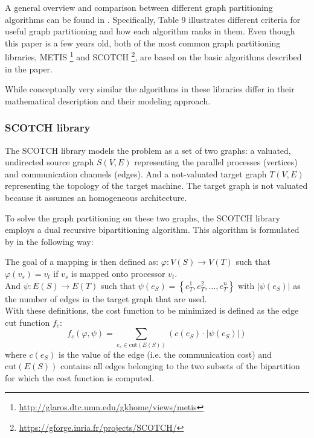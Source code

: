 A general overview and comparison between different graph partitioning algorithms can be found in \citet{karypis1998fast}.
Specifically, Table 9 illustrates different criteria for useful graph partitioning and how each algorithm ranks in them.
Even though this paper is a few years old, both of the most common graph partitioning libraries, METIS \footnote{\href{http://glaros.dtc.umn.edu/gkhome/views/metis}{http://glaros.dtc.umn.edu/gkhome/views/metis}} and SCOTCH \footnote{\href{https://gforge.inria.fr/projects/SCOTCH/}{https://gforge.inria.fr/projects/SCOTCH/}}, are based on the basic algorithms described in the paper.

While conceptually very similar the algorithms in these libraries differ in their mathematical description and their modeling approach.

\subsubsection{SCOTCH library}
The SCOTCH library models the problem as a set of two graphs:
a valuated, undirected source graph $S(V, E)$ representing the parallel processes (vertices) and communication channels (edges). And a not-valuated target graph $T(V, E)$ representing the topology of the target machine.
The target graph is not valuated because it assumes an homogeneous architecture.

To solve the graph partitioning on these two graphs, the SCOTCH library employs a dual recursive bipartitioning algorithm.
This algorithm is formulated by \citet{pellegrini1994static} in the following way:

The goal of a mapping is then defined as:
$\varphi : V\left(S\right) \rightarrow V\left(T\right)$ such that $\varphi\left(v_s\right) = v_t $ if $v_s$ is mapped onto processor $v_t$.
\\
And $\psi : E\left(S\right) \rightarrow E\left(T\right)$ such that $\psi\left(e_S\right) = \left\{ e_T^1, e_T^2, \dots, e_T^n \right\}$ with $\left| \psi\left(e_S\right) \right|$ as the number of edges in the target graph that are used.
\\
With these definitions, the cost function to be minimized is defined as the edge cut function $f_c$:
\begin{equation}
f_c\left(\varphi, \psi \right) = \sum_{e_s \in \text{cut} \left(E\left(S\right)\right)} \left(c\left(e_S\right) \cdot \left| \psi\left(e_S\right) \right| \right)
\end{equation}
where $c\left(e_S\right)$ is the value of the edge (i.e. the communication cost) and $\text{cut} \left(E\left(S\right)\right)$ contains all edges belonging to the two subsets of the bipartition for which the cost function is computed.


